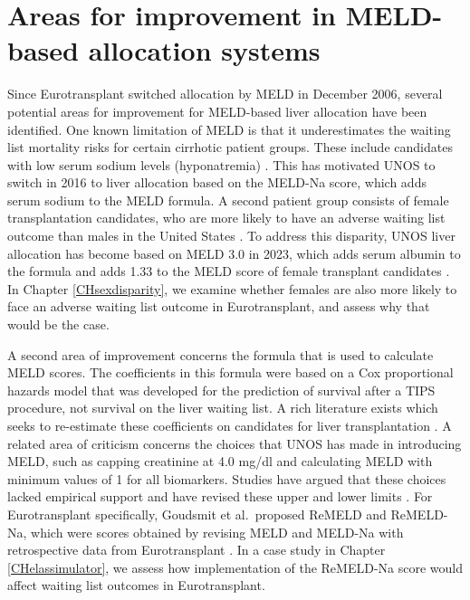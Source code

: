 \documentclass[11pt,twoside,]{book}
\begin{document}
\section{Areas for improvement in MELD-based allocation systems}\label{areas-for-improvement-in-meld-based-allocation-systems}

Since Eurotransplant switched allocation by MELD in December 2006,
several potential areas for improvement for MELD-based liver allocation have been
identified. One known limitation of MELD is that
it underestimates the waiting list mortality risks for certain
cirrhotic patient groups. These include candidates with low serum sodium
levels (hyponatremia) \citep{kimHyponatremiaMortalityPatients2008a}. This has motivated
UNOS to switch in 2016 to liver allocation based on the MELD-Na score, which adds
serum sodium to the MELD formula. A second patient group consists of female transplantation
candidates, who are more likely to have an adverse waiting list outcome than males
in the United States \citep{moylanDisparitiesLiverTransplantation2008}. To address
this disparity, UNOS liver allocation has become based on MELD 3.0 in 2023, which
adds serum albumin to the formula and adds 1.33 to the MELD score of female transplant candidates \citep{kimMELD3point0}. In Chapter \ref{CHsexdisparity}, we examine whether
females are also more likely to face an adverse waiting list outcome in
Eurotransplant, and assess why that would be the case.

A second area of improvement concerns the formula that is used to calculate MELD scores.
The coefficients in this formula were based on a Cox proportional hazards model
that was developed for the prediction of survival after a TIPS procedure, not survival
on the liver waiting list. A rich literature exists which seeks to re-estimate
these coefficients on candidates for liver transplantation \citep{merionLongitudinalAssessmentMortality2003, sharmaReweightingModelEndStage2008, leiseRevisedModelEndstage2011}.
A related area of criticism concerns the choices that UNOS has made in introducing MELD,
such as capping creatinine at 4.0 mg/dl and
calculating MELD with minimum values of 1 for all biomarkers. Studies have
argued that these choices lacked empirical support and have revised these
upper and lower limits \citep{leiseRevisedModelEndstage2011}. For Eurotransplant specifically,
Goudsmit et al.~proposed ReMELD and ReMELD-Na, which were scores obtained by
revising MELD and MELD-Na with retrospective data from Eurotransplant \citep{goudsmitRefittingModelEndstage2020}. In a case study in Chapter \ref{CHelassimulator}, we assess how implementation
of the ReMELD-Na score would affect waiting list outcomes in Eurotransplant.
\end{document}
